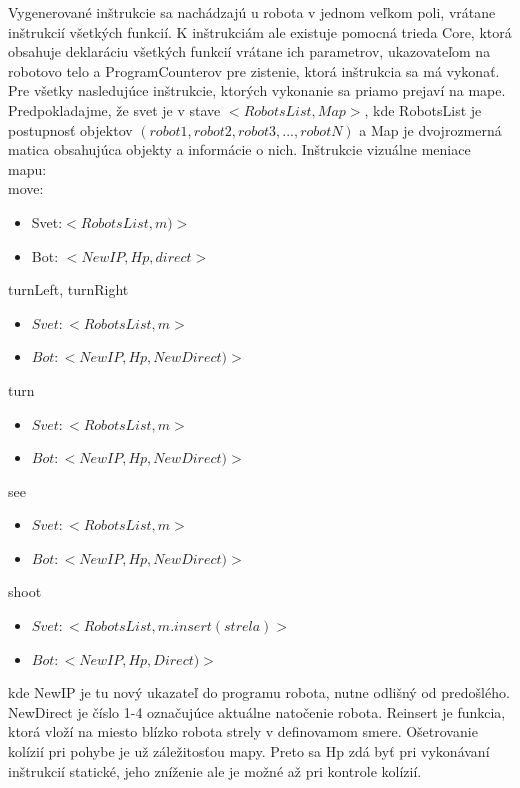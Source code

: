 Vygenerované inštrukcie sa nachádzajú u robota v jednom veľkom poli, vrátane inštrukcií všetkých funkcií. K inštrukciám ale existuje pomocná trieda Core, ktorá obsahuje deklaráciu všetkých funkcií vrátane ich parametrov, ukazovateľom na robotovo telo a ProgramCounterov pre zistenie, ktorá inštrukcia sa má vykonať. \\
Pre všetky nasledujúce inštrukcie, ktorých vykonanie sa priamo prejaví na mape. Predpokladajme, že svet je v stave $<RobotsList, Map>$, kde RobotsList je postupnosť objektov $(robot1,robot2, robot3,...,robotN)$ a Map je dvojrozmerná matica obsahujúca objekty a informácie o nich. Inštrukcie vizuálne meniace mapu:\\
move:\begin {itemize}
\item Svet:$ < RobotsList, m) > $
\item Bot: $ < NewIP, Hp, direct> $
\end {itemize}
turnLeft, turnRight \begin{itemize}
\item $Svet:  <RobotsList, m>$
\item $Bot:  < NewIP, Hp, NewDirect)>$
\end{itemize}
turn  \begin{itemize}
\item $Svet:  < RobotsList, m > $
\item $Bot:   < NewIP, Hp, NewDirect)> $
\end {itemize}
see  \begin{itemize}
\item $Svet:  <RobotsList,m> $
\item $ Bot:  < NewIP, Hp, NewDirect)> $
\end {itemize}
shoot \begin {itemize}
\item $ Svet:  < RobotsList, m.insert(strela)> $ 
\item $ Bot:  < NewIP, Hp, Direct)>  $
\end {itemize}
\indent
kde NewIP je tu nový ukazateľ do programu robota, nutne odlišný od predošlého. NewDirect je číslo 1-4 označujúce aktuálne natočenie robota.
Reinsert je funkcia, ktorá vloží na miesto blízko robota strely v definovamom smere. Ošetrovanie kolízií pri pohybe je už záležitosťou mapy. Preto sa Hp zdá byť pri vykonávaní inštrukcií statické, jeho zníženie ale je možné až pri kontrole kolízií.

